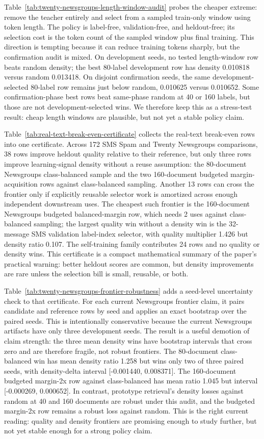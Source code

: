 \documentclass[11pt]{article}
\begin{document}
Table~\ref{tab:twenty-newsgroups-length-window-audit} probes the cheaper
extreme: remove the teacher entirely and select from a sampled train-only window
using token length. The policy is label-free, validation-free, and heldout-free;
its selection cost is the token count of the sampled window plus final training.
This direction is tempting because it can reduce training tokens sharply, but
the confirmation audit is mixed. On development seeds, no tested length-window
row beats random density; the best 80-label development row has density
0.010818 versus random 0.013418. On disjoint confirmation seeds, the same
development-selected 80-label row remains just below random, 0.010625 versus
0.010652. Some confirmation-phase best rows beat same-phase random at 40 or 160
labels, but those are not development-selected wins. We therefore keep this as
a stress-test result: cheap length windows are plausible, but not yet a stable
policy claim.

Table~\ref{tab:real-text-break-even-certificate} collects the real-text
break-even rows into one certificate. Across 172 SMS Spam and Twenty Newsgroups
comparisons, 38 rows improve heldout quality relative to their reference, but
only three rows improve learning-signal density without a reuse assumption: the
80-document Newsgroups class-balanced sample and the two 160-document budgeted
margin-acquisition rows against class-balanced sampling. Another 13 rows can
cross the frontier only if explicitly reusable selector work is amortized across
enough independent downstream uses. The cheapest such frontier is the
160-document Newsgroups budgeted balanced-margin row, which needs 2 uses
against class-balanced sampling; the largest quality win without a density win
is the 32-message SMS validation label-index selector, with quality multiplier
1.426 but density ratio 0.107. The self-training family contributes 24 rows and
no quality or density wins. This
certificate is a compact mathematical summary of the paper's practical warning:
better heldout scores are common, but density improvements are rare unless the
selection bill is small, reusable, or both.

Table~\ref{tab:twenty-newsgroups-frontier-robustness} adds a seed-level
uncertainty check to that certificate. For each current Newsgroups frontier
claim, it pairs candidate and reference rows by seed and applies an exact
bootstrap over the paired seeds. This is intentionally conservative because the
current Newsgroups artifacts have only three development seeds. The result is a
useful demotion of claim strength: the three mean density wins have bootstrap
intervals that cross zero and are therefore fragile, not robust frontiers. The
80-document class-balanced win has mean density ratio 1.258 but wins only two of
three paired seeds, with density-delta interval [-0.001440, 0.008371]. The
160-document budgeted margin-2x row against class-balanced has mean ratio 1.045
but interval [-0.000269, 0.000652]. In contrast, prototype retrieval's density
losses against random at 40 and 160 documents are robust under this audit, and
the budgeted margin-2x row remains a robust loss against random. This is the
right current reading: quality and density frontiers are promising enough to
study further, but not yet stable enough for a strong policy claim.
\end{document}

